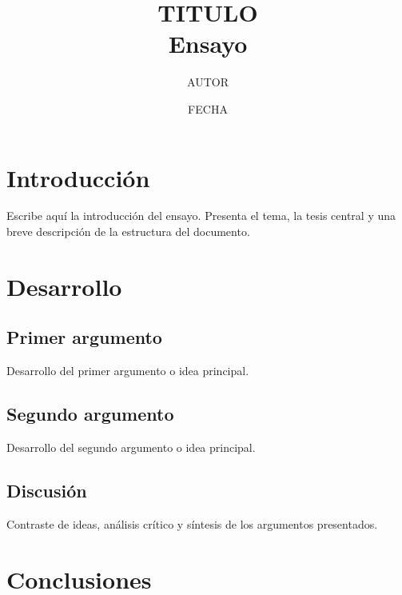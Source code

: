 \documentclass[12pt, a4paper]{report}
\title{
  \vspace{-2cm}
  {\LARGE {{TITULO}}} \\[0.5cm]
  {\large Ensayo}
}
\author{{{AUTOR}}}
\date{{{FECHA}}}
\begin{document}
\maketitle
\thispagestyle{empty}
\newpage

\tableofcontents
\newpage

\chapter{Introducción}


Escribe aquí la introducción del ensayo. Presenta el tema, la tesis
central y una breve descripción de la estructura del documento.

\chapter{Desarrollo}

\section{Primer argumento}

Desarrollo del primer argumento o idea principal.

\section{Segundo argumento}

Desarrollo del segundo argumento o idea principal.

\section{Discusión}

Contraste de ideas, análisis crítico y síntesis de los argumentos
presentados.

\chapter{Conclusiones}
\end{document}
